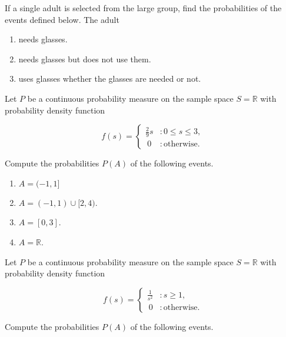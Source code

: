 \documentclass[12pt,reqno]{amsart}
\begin{document}
If a single adult is selected from the large group, find the probabilities of the events defined below. The adult

\medskip
\begin{enumerate}
\item needs glasses.\vfill
\item needs glasses but does not use them.\vfill
\item uses glasses whether the glasses are needed or not.\vfill
\end{enumerate}















\prob Let $P$ be a continuous probability measure on the sample space $S=\mathbb{R}$ with probability density function

	\[
	f(s) = \begin{cases}
	\frac{2}{9}s & : 0 \leq s \leq 3, \\\
	0 & : \text{otherwise}.    
	\end{cases}
	\]

Compute the probabilities $P(A)$ of the following events.

\medskip
\begin{enumerate}
\item $A=(-1, 1]$\vfill
\item $A = (-1,1) \cup [2, 4)$.\vfill
\item $A = [0,3]$.\vfill
\item $A = \mathbb{R}$.\vfill
\end{enumerate}











\newpage
\prob Let $P$ be a continuous probability measure on the sample space $S=\mathbb{R}$ with probability density function

	\[
	f(s) = \begin{cases}
	\displaystyle\frac{1}{s^2} & : s \geq 1, \\\
	0 & : \text{otherwise}.    
	\end{cases}
	\]

Compute the probabilities $P(A)$ of the following events.
\end{document}
